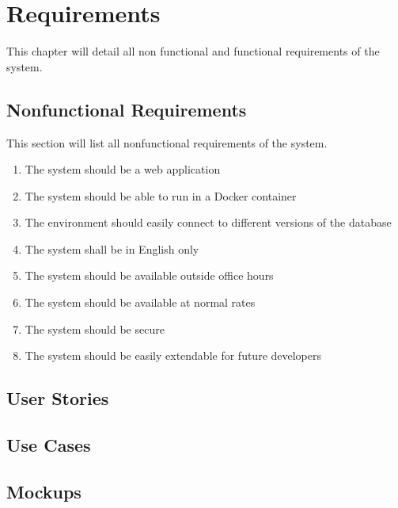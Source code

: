 \chapter{Requirements}
This chapter will detail all non functional and functional requirements of the system.

\section{Nonfunctional Requirements}
This section will list all nonfunctional requirements of the system.

\begin{enumerate}
	\item The system should be a web application
	\item The system should be able to run in a Docker container
	\item The environment should easily connect to different versions of the database
	\item The system shall be in English only
	\item The system should be available outside office hours
	\item The system should be available at normal rates
	\item The system should be secure
	\item The system should be easily extendable for future developers
\end{enumerate}

\section{User Stories}



\section{Use Cases}

\section{Mockups}
